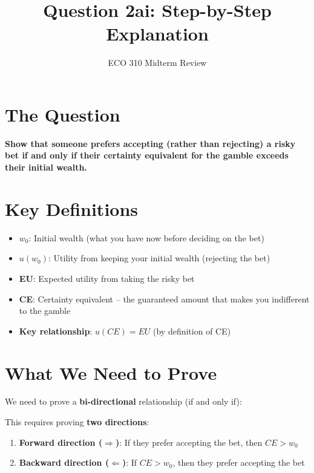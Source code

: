 \documentclass[12pt]{article}
\title{Question 2ai: Step-by-Step Explanation}
\author{ECO 310 Midterm Review}
\date{}
\begin{document}
\maketitle

\section*{The Question}

\textbf{Show that someone prefers accepting (rather than rejecting) a risky bet if and only if their certainty equivalent for the gamble exceeds their initial wealth.}

\section*{Key Definitions}

\begin{tcolorbox}[colback=blue!5!white,colframe=blue!75!black,title=Important Terms]
\begin{itemize}[leftmargin=*]
    \item \textbf{$w_0$}: Initial wealth (what you have now before deciding on the bet)
    \item \textbf{$u(w_0)$}: Utility from keeping your initial wealth (rejecting the bet)
    \item \textbf{EU}: Expected utility from taking the risky bet
    \item \textbf{CE}: Certainty equivalent -- the guaranteed amount that makes you indifferent to the gamble
    \item \textbf{Key relationship}: $u(CE) = EU$ (by definition of CE)
\end{itemize}
\end{tcolorbox}

\section*{What We Need to Prove}

We need to prove a \textbf{bi-directional} relationship (if and only if):

\begin{center}
\end{center}

This requires proving \textbf{two directions}:
\begin{enumerate}
    \item \textbf{Forward direction ($\Rightarrow$)}: If they prefer accepting the bet, then $CE > w_0$
    \item \textbf{Backward direction ($\Leftarrow$)}: If $CE > w_0$, then they prefer accepting the bet
\end{enumerate}
\end{document}
